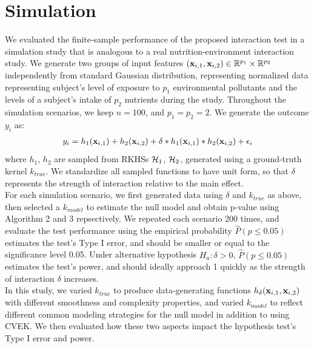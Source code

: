 \documentclass[11pt]{article}
\begin{document}
\section{{\bf Simulation}}
We evaluated the finite-sample performance of the proposed interaction test in a simulation study that is analogous to a real nutrition-environment interaction study. We generate two groups of input features $({\bf x}_{i, 1}, {\bf x}_{i,2}) \in \mathbb{R}^{p_1} \times \mathbb{R}^{p_2}$ independently from standard Gaussian distribution, representing normalized data representing subject's level of exposure to $p_1$ environmental pollutants and the levels of a subject's intake of $p_2$ nutrients during the study. Throughout the simulation scenarios, we keep $n=100$, and $p_1=p_2=2$. We generate the outcome $y_i$ as:
\begin{align*}
y_i=h_1({\bf x}_{i, 1})+h_2({\bf x}_{i, 2})+\delta * h_1({\bf x}_{i, 1}) * h_2({\bf x}_{i, 2})+\epsilon_i
\end{align*}
where $h_1$, $h_2$ are sampled from RKHSs ${\cal H}_1$, ${\cal H}_2$, generated using a ground-truth kernel $k_{true}$. We standardize all sampled functions to have unit form, so that $\delta$ represents the strength of interaction relative to the main effect.\\
For each simulation scenario, we first generated data using $\delta$ and $k_{true}$ as above, then selected a $k_{model}$ to estimate the null model and obtain p-value using Algorithm 2 and 3 repsectively. We repeated each scenario 200 times, and evaluate the test performance using the empirical probability $\hat{P}(p\leq 0.05)$ estimates the test's Type I error, and should be smaller or equal to the significance level 0.05. Under alternative hypothesis $H_a: \delta>0$, $\hat{P}(p\leq 0.05)$ estimates the test's power, and should ideally approach 1 quickly as the strength of interaction $\delta$ increases.\\
In this study, we varied $k_{true}$ to produce data-generating functions $h_\delta({\bf x}_{i, 1}, {\bf x}_{i, 2})$ with different smoothness and complexity properties, and varied $k_{model}$ to reflect different common modeling strategies for the null model in addition to using CVEK. We then evaluated how these two aspects impact the hypothesis test's Type I error and power.\\
\end{document}
